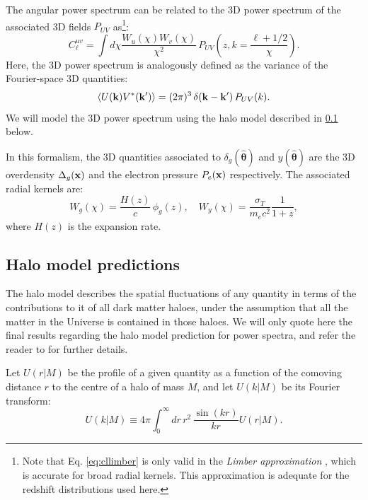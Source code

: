 \documentclass[useAMS,usenatbib]{mn2e}
\newcommand{\nv}{\hat{\boldsymbol{\theta}}}
\begin{document}
    The angular power spectrum can be related to the 3D power spectrum of the associated 3D fields $P_{UV}$ as\footnote{Note that Eq. \ref{eq:cllimber} is only valid in the {\sl Limber approximation} \citep{1953ApJ...117..134L}, which is accurate for broad radial kernels. This approximation is adequate for the redshift distributions used here.}:
    \begin{equation}\label{eq:cllimber}
      C_\ell^{uv} = \int d\chi \frac{W_u(\chi)W_v(\chi)}{\chi^2}\,P_{UV}\left( z, k=\frac{\ell+1/2}{\chi} \right).
    \end{equation}
    Here, the 3D power spectrum is analogously defined as the variance of the Fourier-space 3D quantities:
    \begin{equation}
      \left\langle U({\bf k})V^*({\bf k}')\right\rangle = (2\pi)^3\,\delta({\bf k}-{\bf k}')\,P_{UV}(k).
    \end{equation}
    We will model the 3D power spectrum using the halo model described in \ref{ssec:theory.hm} below.

    In this formalism, the 3D quantities associated to $\delta_g(\nv)$ and $y(\nv)$ are the 3D overdensity $\Delta_g({\bf x})$ and the electron pressure $P_e({\bf x})$ respectively. The associated radial kernels are:
    \begin{equation}
      W_g(\chi)=\frac{H(z)}{c}\,\phi_g(z),\hspace{12pt}W_y(\chi)=\frac{\sigma_T}{m_ec^2}\frac{1}{1+z},
    \end{equation}
    where $H(z)$ is the expansion rate.

  \subsection{Halo model predictions}\label{ssec:theory.hm}
    The halo model describes the spatial fluctuations of any quantity in terms of the contributions to it of all dark matter haloes, under the assumption that all the matter in the Universe is contained in those haloes. We will only quote here the final results regarding the halo model prediction for power spectra, and refer the reader to \cite{2000MNRAS.318..203S,2000MNRAS.318.1144P,2002PhR...372....1C} for further details.
    
    Let $U(r|M)$ be the profile of a given quantity as a function of the comoving distance $r$ to the centre of a halo of mass $M$, and let $U(k|M)$ be its Fourier transform:
    \begin{equation}
      U(k|M)\equiv4\pi \int_0^\infty dr\,r^2\,\frac{\sin(kr)}{kr}U(r|M).
    \end{equation}
\end{document}
